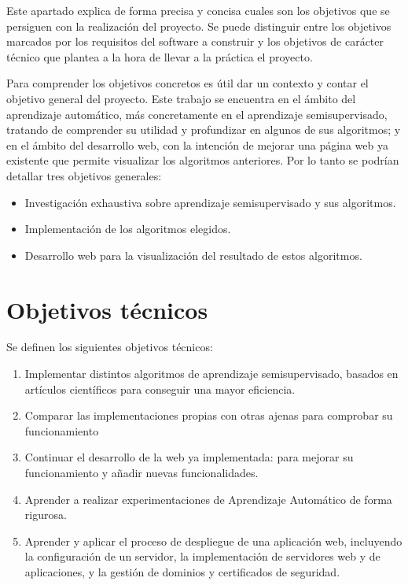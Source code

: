 
Este apartado explica de forma precisa y concisa cuales son los objetivos que se persiguen con la realización del proyecto. Se puede distinguir entre los objetivos marcados por los requisitos del software a construir y los objetivos de carácter técnico que plantea a la hora de llevar a la práctica el proyecto.

Para comprender los objetivos concretos es útil dar un contexto y contar el objetivo general del proyecto. Este trabajo se encuentra en el ámbito del aprendizaje automático, más concretamente en el aprendizaje semisupervisado, tratando de comprender su utilidad y profundizar en algunos de sus algoritmos; y en el ámbito del desarrollo web, con la intención de mejorar una página web ya existente que permite visualizar los algoritmos anteriores. Por lo tanto se podrían detallar tres objetivos generales:
\begin{itemize}
	\item Investigación exhaustiva sobre aprendizaje semisupervisado y sus algoritmos.
	\item Implementación de los algoritmos elegidos.
	\item Desarrollo web para la visualización del resultado de estos algoritmos.
\end{itemize}

\section{Objetivos técnicos}
Se definen los siguientes objetivos técnicos:

\begin{enumerate}
	\item Implementar distintos algoritmos de aprendizaje semisupervisado, basados en artículos científicos para conseguir una mayor eficiencia.
	\item Comparar las implementaciones propias con otras ajenas para comprobar su funcionamiento
	\item Continuar el desarrollo de la web ya implementada: para mejorar su funcionamiento y añadir nuevas funcionalidades.
	\item Aprender a realizar experimentaciones de Aprendizaje Automático de forma rigurosa.
	\item Aprender y aplicar el proceso de despliegue de una aplicación web, incluyendo la configuración de un servidor, la implementación de servidores web y de aplicaciones, y la gestión de dominios y certificados de seguridad.
\end{enumerate}

